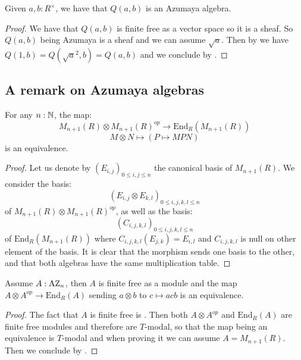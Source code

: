 \begin{lemma}
Given $a,b:R^\times$, we have that $Q(a,b)$ is an Azumaya algebra. 
\end{lemma}

\begin{proof}
We have that $Q(a,b)$ is finite free as a vector space so it is a sheaf. So $Q(a,b)$ being Azumaya is a sheaf and we can assume $\sqrt{a}$. Then by  we have $Q(1,b) = Q(\sqrt{a}^2,b) = Q(a,b)$ and we conclude by .
\end{proof}


\subsection{A remark on Azumaya algebras}

\begin{lemma}\label{MnR-endomorphism-multiplication}
For any $n:\mathbb{N}$, the map:
\[M_{n+1}(R)\otimes M_{n+1}(R)^{op}\to \mathrm{End}_R(M_{n+1}(R))\]
\[M\otimes N\mapsto (P\mapsto MPN)\]
is an equivalence.
\end{lemma}

\begin{proof}
Let us denote by $(E_{i,j})_{0\leq i,j\leq n}$ the canonical basis of $M_{n+1}(R)$. We consider the basis: 
\[(E_{i,j}\otimes E_{k,l})_{0\leq i,j,k,l\leq n}\] 
of $M_{n+1}(R)\otimes M_{n+1}(R)^{op}$, as well as the basis:
\[(C_{i,j,k,l})_{0\leq i,j,k,l\leq n}\] 
of $\mathrm{End}_R(M_{n+1}(R))$ where $C_{i,j,k,l}(E_{j,k}) = E_{i,l}$ and $C_{i,j,k,l}$ is null on other element of the basis. It is clear that the morphism sends one basis to the other, and that both algebras have the same multiplication table. 
\end{proof}

\begin{lemma}
Assume $A:\mathrm{AZ}_n$, then $A$ is finite free as a module and the map $A\otimes A^{op}\to \mathrm{End}_R(A)$ sending $a\otimes b$ to $c\mapsto acb$ is an equivalence.
\end{lemma}

\begin{proof}
The fact that $A$ is finite free is . Then both $A\otimes A^{op}$ and $\mathrm{End}_R(A)$ are finite free modules and therefore are $T$-modal, so that the map being an equivalence is $T$-modal and when proving it we can assume $A=M_{n+1}(R)$. Then we conclude by .
\end{proof}


